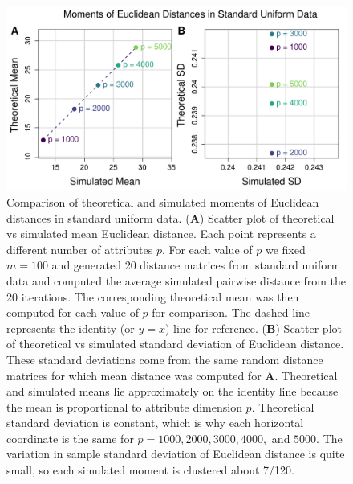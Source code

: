 \documentclass[10pt,letterpaper]{article}\usepackage[]{graphicx}\usepackage[]{color}
\begin{document}
\begin{figure}[H]
	\includegraphics[width=\textwidth]{compared_moments_uniform_euclidean_standard.pdf}
	\caption{Comparison of theoretical and simulated moments of Euclidean distances in standard uniform data. (\textbf{A}) Scatter plot of theoretical vs simulated mean Euclidean distance. Each point represents a different number of attributes $p$. For each value of $p$ we fixed $m=100$ and generated 20 distance matrices from standard uniform data and computed the average simulated pairwise distance from the 20 iterations. The corresponding theoretical mean was then computed for each value of $p$ for comparison. The dashed line represents the identity (or $y=x$) line for reference. (\textbf{B}) Scatter plot of theoretical vs simulated standard deviation of Euclidean distance. These standard deviations come from the same random distance matrices for which mean distance was computed for \textbf{A}. Theoretical and simulated means lie approximately on the identity line because the mean is proportional to attribute dimension $p$. Theoretical standard deviation is constant, which is why each horizontal coordinate is the same for $p=1000,2000,3000,4000,$ and $5000$. The variation in sample standard deviation of Euclidean distance is quite small, so each simulated moment is clustered about 7/120.}
\end{figure}
\end{document}
